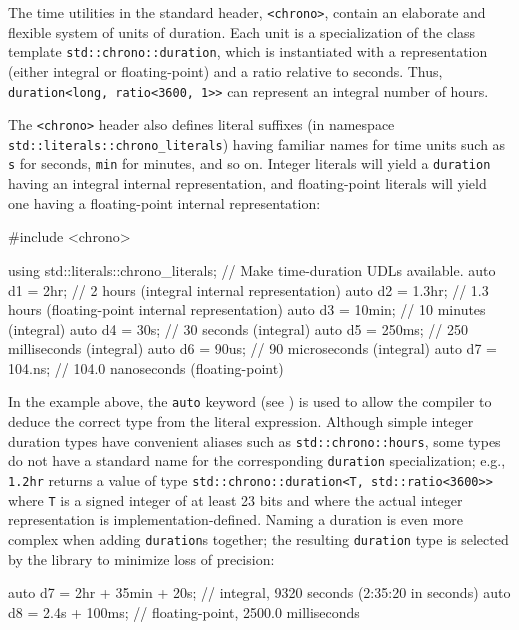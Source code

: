 \noindent The time utilities in the standard header, \lstinline!<chrono>!, contain an
elaborate and flexible system of units of duration. Each unit is a
specialization of the class template\linebreak%
 \lstinline!std::chrono::duration!,
which is instantiated with a representation (either integral or
floating-point) and a ratio relative to seconds. Thus,
\lstinline!duration<long,!~\lstinline!ratio<3600,!~\lstinline!1>>! can represent
an integral number of hours.

The \lstinline!<chrono>! header also defines literal suffixes (in namespace\linebreak%
\lstinline!std::literals::chrono_literals!) having familiar names for time
units such as \lstinline!s! for seconds, \lstinline!min! for minutes, and so
on. Integer literals will yield a \lstinline!duration! having an integral
internal representation, and floating-point literals will yield one
having a floating-point internal representation:

\begin{emcppslisting}
#include <chrono>

using std::literals::chrono_literals;  // Make time-duration UDLs available.
auto d1 = 2hr;     // 2 hours   (integral internal representation)
auto d2 = 1.3hr;   // 1.3 hours (floating-point internal representation)
auto d3 = 10min;   // 10 minutes (integral)
auto d4 = 30s;     // 30 seconds (integral)
auto d5 = 250ms;   // 250 milliseconds (integral)
auto d6 = 90us;    // 90 microseconds (integral)
auto d7 = 104.ns;  // 104.0 nanoseconds (floating-point)
\end{emcppslisting}
    
\noindent In the example above, the \lstinline!auto! keyword (see ) is used to allow the compiler to deduce
the correct type from the literal expression. Although simple integer
duration types have convenient aliases such as
\lstinline!std::chrono::hours!, some types do not have a standard name for
the corresponding \lstinline!duration! specialization; e.g., \lstinline!1.2hr!
returns a value of type
\lstinline!std::chrono::duration<T, std::ratio<3600>>! where \lstinline!T! is a signed integer of at least 23 bits and 
where the actual integer representation is implementation-defined.
Naming a duration is even more complex when adding \lstinline!duration!s
together; the resulting \lstinline!duration! type is selected by the
library to minimize loss of precision:

\begin{emcppslisting}
auto d7 = 2hr + 35min + 20s;  // integral, 9320 seconds (2:35:20 in seconds)
auto d8 = 2.4s + 100ms;       // floating-point, 2500.0 milliseconds
\end{emcppslisting}
    

